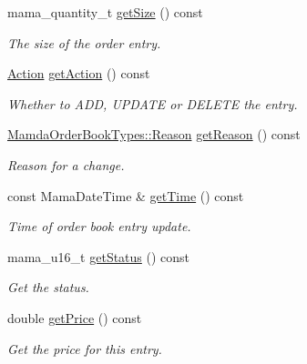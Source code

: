 \begin{CompactItemize}
mama\_\-quantity\_\-t \hyperlink{classWombat_1_1MamdaOrderBookEntry_137d6488b4264e8b3f4509fe1f543aee}{get\-Size} () const 
\begin{CompactList}\small\item\em The size of the order entry. \item\end{CompactList}\item 
\hyperlink{classWombat_1_1MamdaOrderBookEntry_fc6cb1d67c7601d093a36f59cf9bcef4}{Action} \hyperlink{classWombat_1_1MamdaOrderBookEntry_ff550a6c85a7eab221361f352d7d9306}{get\-Action} () const 
\begin{CompactList}\small\item\em Whether to ADD, UPDATE or DELETE the entry. \item\end{CompactList}\item 
\hyperlink{classWombat_1_1MamdaOrderBookTypes_a1147c14315f68b9371c92a6a259fbd5}{Mamda\-Order\-Book\-Types::Reason} \hyperlink{classWombat_1_1MamdaOrderBookEntry_0b9f3dbc9f5961c9776fa66f29c426bd}{get\-Reason} () const 
\begin{CompactList}\small\item\em Reason for a change. \item\end{CompactList}\item 
const Mama\-Date\-Time \& \hyperlink{classWombat_1_1MamdaOrderBookEntry_8b116df66b253570f5be048ce8e49ade}{get\-Time} () const 
\begin{CompactList}\small\item\em Time of order book entry update. \item\end{CompactList}\item 
mama\_\-u16\_\-t \hyperlink{classWombat_1_1MamdaOrderBookEntry_03034329cb1dffcf13c4f9521d51532b}{get\-Status} () const 
\begin{CompactList}\small\item\em Get the status. \item\end{CompactList}\item 
double \hyperlink{classWombat_1_1MamdaOrderBookEntry_f1538d504b6b16b45d44a9d9137e899c}{get\-Price} () const 
\begin{CompactList}\small\item\em Get the price for this entry. \item\end{CompactList}\item 

\end{CompactItemize}
